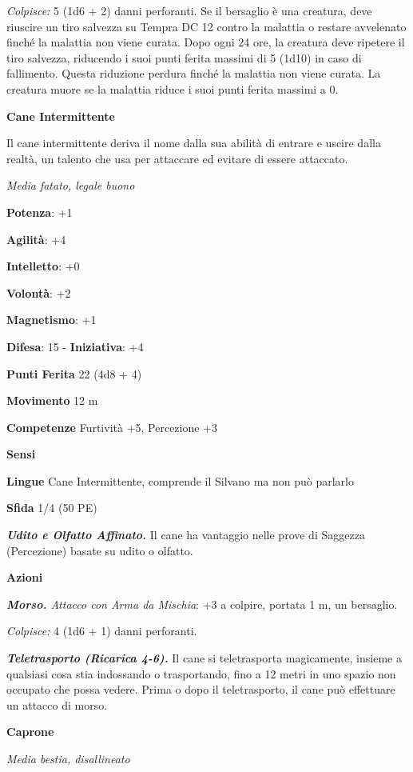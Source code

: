 \begin{multicols}{2}
\emph{Colpisce:} 5 (1d6 + 2) danni perforanti. Se il bersaglio è una
creatura, deve riuscire un tiro salvezza su Tempra DC 12 contro la
malattia o restare avvelenato finché la malattia non viene curata. Dopo
ogni 24 ore, la creatura deve ripetere il tiro salvezza, riducendo i
suoi punti ferita massimi di 5 (1d10) in caso di fallimento. Questa
riduzione perdura finché la malattia non viene curata. La creatura muore
se la malattia riduce i suoi punti ferita massimi a 0.

\textbf{Cane Intermittente}

Il cane intermittente deriva il nome dalla sua abilità di entrare e
uscire dalla realtà, un talento che usa per attaccare ed evitare di
essere attaccato.

\emph{Media fatato, legale buono}

\textbf{Potenza}: +1

\textbf{Agilità}: +4

\textbf{Intelletto}: +0

\textbf{Volontà}: +2

\textbf{Magnetismo}: +1

\textbf{Difesa}: 15 - \textbf{Iniziativa}: +4

\textbf{Punti Ferita} 22 (4d8 + 4)

\textbf{Movimento} 12 m

\textbf{Competenze} Furtività +5, Percezione +3

\textbf{Sensi} 

\textbf{Lingue} Cane Intermittente, comprende il Silvano ma non può
parlarlo

\textbf{Sfida} 1/4 (50 PE)\smallskip

\emph{\textbf{Udito e Olfatto Affinato.}} Il cane ha vantaggio nelle
prove di Saggezza (Percezione) basate su udito o olfatto.

\smallskip\textbf{Azioni}

\emph{\textbf{Morso.} Attacco con Arma da Mischia}: +3 a colpire,
portata 1 m, un bersaglio.

\emph{Colpisce:} 4 (1d6 + 1) danni perforanti.

\emph{\textbf{Teletrasporto (Ricarica 4-6).}} Il cane si teletrasporta
magicamente, insieme a qualsiasi cosa stia indossando o trasportando,
fino a 12 metri in uno spazio non occupato che possa vedere. Prima o
dopo il teletrasporto, il cane può effettuare un attacco di morso.

\textbf{Caprone}

\emph{Media bestia, disallineato}


\end{multicols}
